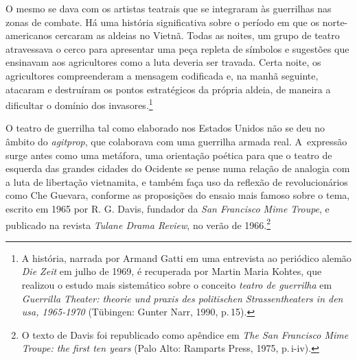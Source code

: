 O mesmo se dava com os artistas teatrais que se integraram às guerrilhas
nas zonas de combate. Há uma história significativa sobre o período em
que os norte-americanos cercaram as aldeias no Vietnã. Todas as noites, 
um grupo de teatro atravessava o cerco para apresentar uma peça
repleta de símbolos e sugestões que ensinavam aos agricultores como a
luta deveria ser travada. Certa noite, os agricultores compreenderam a
mensagem codificada e, na manhã seguinte, atacaram e destruíram os
pontos estratégicos da própria aldeia, de maneira a dificultar o domínio dos
invasores.\footnote{A história, narrada por Armand Gatti em uma
  entrevista ao periódico alemão {\it Die Zeit} em julho de 1969, é
  recuperada por Martin Maria Kohtes, que realizou o estudo mais
  sistemático sobre o conceito {\it teatro de guerrilha} em
  {\it Guerrilla Theater: theorie und praxis des politischen
  Strassentheaters in den {\sc usa}, 1965-1970} (Tübingen: Gunter Narr,
  1990, p.\,15).}

\subject{Conceito estadunidense de Teatro de guerrilha}

O teatro de guerrilha tal como elaborado nos Estados Unidos não se
deu no âmbito do {\it agitprop}, que colaborava com uma guerrilha armada
real. A~expressão surge antes como uma metáfora, uma orientação poética
para que o teatro de esquerda das grandes cidades do Ocidente se pense
numa relação de analogia com a luta de libertação vietnamita, e também
faça uso da reflexão de revolucionários como Che Guevara, conforme as
proposições do ensaio mais famoso sobre o tema, escrito em 1965 por R.
G. Davis, fundador da {\it San Francisco Mime Troupe}, e publicado na
revista {\it Tulane Drama Review}, no verão de 1966.\footnote{O texto de
  Davis foi republicado como apêndice em {\it The San Francisco Mime
  Troupe: the first ten years} (Palo Alto: Ramparts Press, 1975, p.\,i-iv).}


